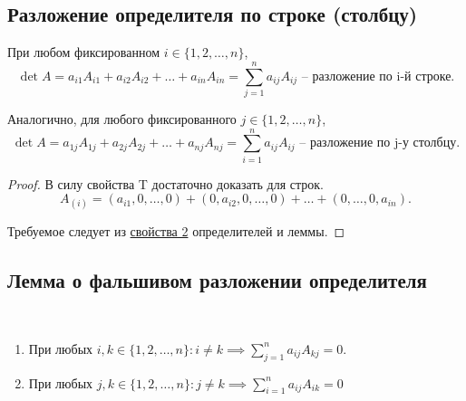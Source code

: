 \subsection{Разложение определителя по строке (столбцу)}
\begin{theorem}
    При любом фиксированном $i \in \{1, 2, \dots, n\}$,
    \begin{equation*}
        \det A = a_{i1} A_{i1} + a_{i2} A_{i2} + \dots + a_{in} A_{in} = \sum_{j = 1}^n a_{ij} A_{ij} \text{ -- разложение по i-й строке}
    .\end{equation*}

    Аналогично, для любого фиксированного $j \in \{1, 2, \dots, n\}$,
    \begin{equation*}
        \det A = a_{1j} A_{1j} + a_{2j} A_{2j} + \dots + a_{nj} A_{nj} = \sum_{i = 1}^{n} a_{ij} A_{ij} \text{ -- разложение по j-у столбцу}
    .\end{equation*}
\end{theorem}

\begin{proof}
    В силу свойства T достаточно доказать для строк.
    \begin{equation*}
        A_{(i)} = (a_{i1}, 0, \dots, 0) + (0, a_{i2}, 0, \dots, 0) + \dots + (0, \dots, 0, a_{in})
    .\end{equation*}

    Требуемое следует из \hyperref[det:prop_2]{свойства 2} определителей и леммы.
\end{proof}


\subsection{Лемма о фальшивом разложении определителя}
\begin{lemma}~
    \begin{enumerate}
    \item
        При любых $i, k \in \{1, 2, \dots, n\} : i \neq k \implies \sum_{j = 1}^n a_{ij} A_{kj} = 0$.
    \item
        При любых $j, k \in \{1, 2, \dots, n\} : j \neq k \implies \sum_{i = 1}^n a_{ij} A_{ik} = 0$
    \end{enumerate}
\end{lemma}

